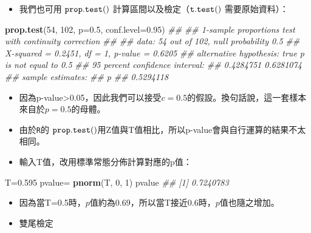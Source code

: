 \documentclass[hyperref,]{ctexart}
\newenvironment{Shaded}{\begin{snugshade}}{\end{snugshade}}
\newcommand{\CommentTok}[1]{\textcolor[rgb]{0.56,0.35,0.01}{\textit{#1}}}
\newcommand{\DataTypeTok}[1]{\textcolor[rgb]{0.13,0.29,0.53}{#1}}
\newcommand{\DecValTok}[1]{\textcolor[rgb]{0.00,0.00,0.81}{#1}}
\newcommand{\FloatTok}[1]{\textcolor[rgb]{0.00,0.00,0.81}{#1}}
\newcommand{\KeywordTok}[1]{\textcolor[rgb]{0.13,0.29,0.53}{\textbf{#1}}}
\newcommand{\NormalTok}[1]{#1}
\newcommand{\StringTok}[1]{\textcolor[rgb]{0.31,0.60,0.02}{#1}}
\providecommand{\tightlist}{%
  \setlength{\itemsep}{0pt}\setlength{\parskip}{0pt}}
\begin{document}
\begin{itemize}
\tightlist
\item
  我們也可用 \(\tt{prop.test()}\) 計算區間以及檢定（\(\tt{t.test()}\)
  需要原始資料）：
\end{itemize}

\begin{Shaded}
\begin{Highlighting}[]
\KeywordTok{prop.test}\NormalTok{(}\DecValTok{54}\NormalTok{, }\DecValTok{102}\NormalTok{, }\DataTypeTok{p=}\FloatTok{0.5}\NormalTok{, }\DataTypeTok{conf.level=}\FloatTok{0.95}\NormalTok{)}
\CommentTok{## }
\CommentTok{##  1-sample proportions test with continuity correction}
\CommentTok{## }
\CommentTok{## data:  54 out of 102, null probability 0.5}
\CommentTok{## X-squared = 0.2451, df = 1, p-value = 0.6205}
\CommentTok{## alternative hypothesis: true p is not equal to 0.5}
\CommentTok{## 95 percent confidence interval:}
\CommentTok{##  0.4284751 0.6281074}
\CommentTok{## sample estimates:}
\CommentTok{##         p }
\CommentTok{## 0.5294118}
\end{Highlighting}
\end{Shaded}

\begin{itemize}
\item
  因為p-value\textgreater0.05，因此我們可以接受\(c=0.5\)的假設。換句話說，這一套樣本來自於\(p=0.5\)的母體。
\item
  由於\texttt{R}的
  \(\tt{prop.test()}\)用Z值與T值相比，所以p-value會與自行運算的結果不太相同。
\item
  輸入T值，改用標準常態分佈計算對應的p值：
\end{itemize}

\begin{Shaded}
\begin{Highlighting}[]
\NormalTok{T=}\FloatTok{0.595}
\NormalTok{pvalue=}\StringTok{ }\KeywordTok{pnorm}\NormalTok{(T, }\DecValTok{0}\NormalTok{, }\DecValTok{1}\NormalTok{)}
\NormalTok{pvalue}
\CommentTok{## [1] 0.7240783}
\end{Highlighting}
\end{Shaded}

\begin{itemize}
\tightlist
\item
  因為當T=0.5時，\(p\)值約為0.69，所以當T接近0.6時，\(p\)值也隨之增加。
\item
  雙尾檢定
\end{itemize}
\end{document}
